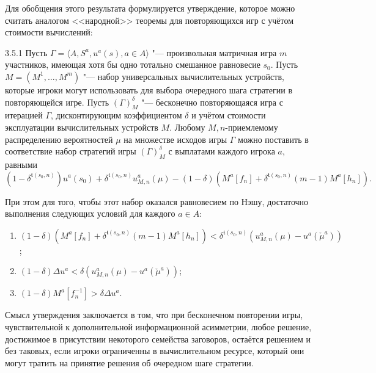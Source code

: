 Для обобщения этого результата формулируется утверждение, которое можно считать аналогом <<народной>> теоремы для повторяющихся игр с учётом стоимости вычислений: \begin{theorem}{3.5.1}
	Пусть $\Gamma = \langle A, S^a, u^a(s), a \in A \rangle$ "--- произвольная матричная игра $m$ участников, имеющая хотя бы одно тотально смешанное равновесие $s_0$. Пусть $M = (M^1, \ldots, M^m)$ "--- набор универсальных вычислительных устройств, которые игроки могут использовать для выбора очередного шага стратегии в повторяющейся игре. Пусть $(\Gamma)_M^{\delta}$ "--- бесконечно повторяющаяся игра с итерацией $\Gamma$, дисконтирующим коэффициентом $\delta$ и учётом стоимости эксплуатации вычислительных устройств $M$. Любому $M,n$-приемлемому распределению вероятностей $\mu$ на множестве исходов игры $\Gamma$ можно поставить в соответствие набор стратегий игры $(\Gamma)_M^{\delta}$ с выплатами каждого игрока $a$, равными %
	\begin{equation*}
		(1 - \delta^{\mathfrak{t}(s_0, n)}) u^a(s_0) + \delta^{\mathfrak{t}(s_0, n)} u_{M,n}^a(\mu) - (1 - \delta) (M^a[f_n] + \delta^{\mathfrak{t}(s_0, n)} (m - 1) M^a[h_n]).
	\end{equation*}
	
	При этом для того, чтобы этот набор оказался равновесием по Нэшу, достаточно выполнения следующих условий для каждого $a \in A$:
	\begin{enumerate}
		\item $(1 - \delta) (M^a[f_n] + \delta^{\mathfrak{t}(s_0, n)} (m - 1) M^a[h_n]) < \delta^{\mathfrak{t}(s_0, n)}(u_{M,n}^a(\mu) - u^a(\check{\mu}^a))$;
		\item $(1 - \delta) \Delta u^a < \delta (u_{M,n}^a(\mu) - u^a(\check{\mu}^a))$;
		\item $(1 - \delta) M^a[f_n^{-1}] > \delta \Delta u^a$.
	\end{enumerate}
\end{theorem}

Смысл утверждения заключается в том, что при бесконечном повторении игры, чувствительной к дополнительной информационной асимметрии, любое решение, достижимое в присутствии некоторого семейства заговоров, остаётся решением и без таковых, если игроки ограниченны в вычислительном ресурсе, который они могут тратить на принятие решения об очередном шаге стратегии.



